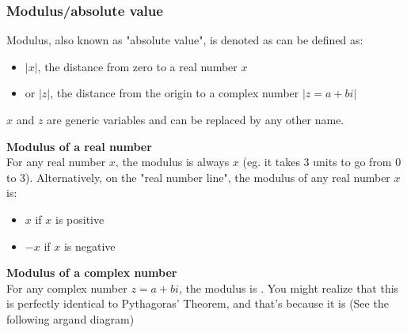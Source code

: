 \documentclass{article}
\begin{document}
\begin{center}
\end{center}

\subsubsection{Modulus/absolute value}
Modulus, also known as "absolute value", is denoted as can be defined as:
\begin{itemize}
    \item $|x|$, the distance from zero to a real number $x$
    \item or $|z|$, the distance from the origin to a complex number $|z=a+bi|$
\end{itemize}

\noindent$x$ and $z$ are generic variables and can be replaced by any other name.

\vspace{\baselineskip}

\noindent\textbf{Modulus of a real number} \\
For any real number $x$, the modulus is always $x$ (eg. it takes 3 units to go from 0 to 3). Alternatively, on the "real number line", the modulus of any real number $x$ is:
\begin{itemize}
    \item $x$ if $x$ is positive
    \item $-x$ if $x$ is negative
\end{itemize}

\noindent\textbf{Modulus of a complex number} \\
For any complex number $z=a+bi$, the modulus is . You might realize that this is perfectly identical to Pythagoras' Theorem, and that's because it is (See the following argand diagram)
\end{document}
